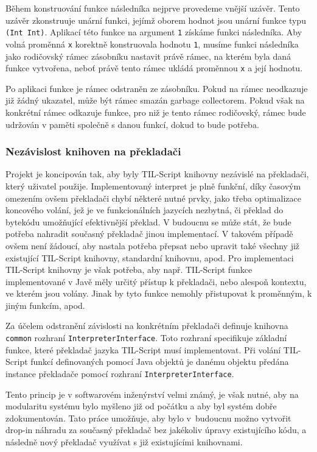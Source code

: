 Během konstruování funkce následníka nejprve provedeme vnější uzávěr. Tento uzávěr zkonstruuje
unární funkci, jejímž oborem hodnot jsou unární funkce typu \lstinline{(Int Int)}. Aplikací této
funkce na argument \lstinline{1} získáme funkci následníka. Aby volná proměnná \lstinline{x}
korektně konstruovala hodnotu \lstinline{1}, musíme funkci následníka jako rodičovský rámec
zásobníku nastavit právě rámec, na kterém byla daná funkce vytvořena, neboť právě tento rámec
ukládá proměnnou \lstinline{x} a její hodnotu.

Po aplikaci funkce je rámec odstraněn ze zásobníku. Pokud na rámec neodkazuje již žádný ukazatel,
může být rámec smazán garbage collectorem. Pokud však na konkrétní rámec odkazuje funkce, pro niž
je tento rámec rodičovský, rámec bude udržován v paměti společně s danou funkcí, dokud to bude
potřeba.

\subsubsection{Nezávislost knihoven na překladači}

Projekt je koncipován tak, aby byly TIL-Script knihovny nezávislé na překladači, který uživatel
použije. Implementovaný interpret je plně funkční, díky časovým omezením ovšem překladači chybí
některé nutné prvky, jako třeba optimalizace koncového volání, jež je ve funkcionálních
jazycích nezbytná, či překlad do bytekódu umožňující efektivnější překlad. V budoucnu se může stát,
že bude potřeba nahradit současný překladač jinou implementací. V takovém případě ovšem není
žádoucí, aby nastala potřeba přepsat nebo upravit také všechny již existující TIL-Script knihovny,
standardní knihovnu, apod. Pro implementaci TIL-Script knihovny je však potřeba, aby např.
TIL-Script funkce implementované v Javě měly určitý přístup k překladači, nebo alespoň kontextu,
ve kterém jsou volány. Jinak by tyto funkce nemohly přistupovat k proměnným, k jiným funkcím, apod.

Za účelem odstranění závislosti na konkrétním překladači definuje knihovna \lstinline{common}
rozhraní \lstinline{InterpreterInterface}. Toto rozhraní specifikuje základní funkce, které
překladač jazyka TIL-Script musí implementovat. Při volání TIL-Script funkcí definovaných pomocí
Java objektů je danému objektu předána instance překladače pomocí rozhraní
\lstinline{InterpreterInterface}.

Tento princip je v softwarovém inženýrství velmi známý, je však nutné, aby na modularitu systému
bylo myšleno již od počátku a aby byl systém dobře zdokumentován. Tato práce umožňuje, aby bylo
v~budoucnu možno vytvořit drop-in náhradu za současný překladač bez jakékoliv úpravy existujícího
kódu, a následně nový překladač využívat s již existujícími knihovnami.

\endinput
